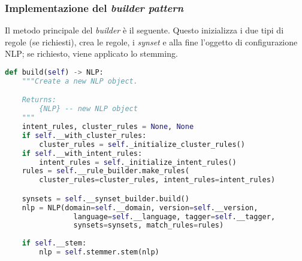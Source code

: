 \subsubsection*{Implementazione del \textit{builder pattern}}
Il metodo principale del \textit{builder} è il seguente. Questo inizializza i due tipi di regole (se richiesti), crea le regole, i \textit{synset} e alla fine l'oggetto di configurazione NLP; se richiesto, viene applicato lo stemming.  
\begin{lstlisting}[language=python]
def build(self) -> NLP:
    """Create a new NLP object.

    Returns:
        {NLP} -- new NLP object
    """
    intent_rules, cluster_rules = None, None
    if self.__with_cluster_rules:
        cluster_rules = self._initialize_cluster_rules()
    if self.__with_intent_rules:
        intent_rules = self._initialize_intent_rules()
    rules = self.__rule_builder.make_rules(
        cluster_rules=cluster_rules, intent_rules=intent_rules)

    synsets = self.__synset_builder.build()
    nlp = NLP(domain=self.__domain, version=self.__version,
                language=self.__language, tagger=self.__tagger,
                synsets=synsets, match_rules=rules)
                
    if self.__stem:
        nlp = self.stemmer.stem(nlp)
\end{lstlisting}